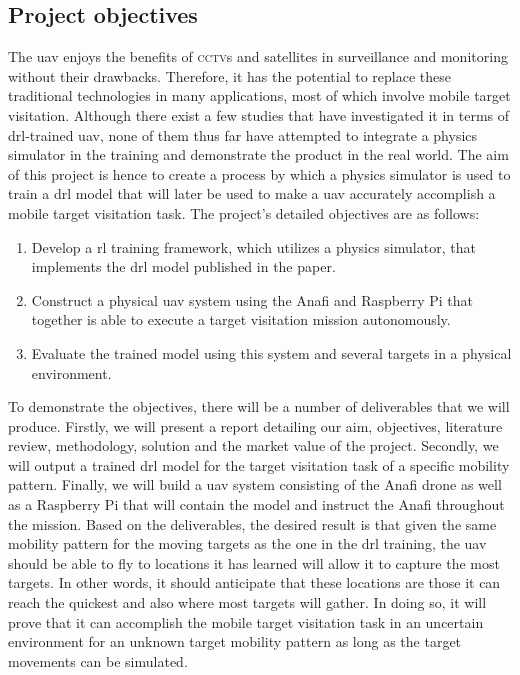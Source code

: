 \documentclass[../main.tex]{subfiles}
\begin{document}

\subsection{Project objectives}\label{sec:objectives}

The \gls{uav} enjoys the benefits of \textsc{cctv}s and satellites
in surveillance and monitoring without their drawbacks.
Therefore, it has the potential to replace these
traditional technologies in many applications, 
most of which involve mobile target visitation. 
Although there exist a few studies 
that have investigated it in terms of \gls{drl}-trained
\gls{uav},
none of them thus far have attempted to
integrate a physics simulator in the training
and demonstrate the product in the real world.
The aim of this project is hence to create a process 
by which a physics simulator is used to train 
a \gls{drl} model that will later be used
to make a \gls{uav} accurately accomplish a
mobile target visitation task.
The project's detailed objectives are as follows:

\begin{enumerate}
    \item Develop a \gls{rl} training framework,
        which utilizes a physics simulator, 
        that implements the \gls{drl} model 
        published in the \textcite{Ged21} paper.
    \item Construct a physical \gls{uav} system 
        using the Anafi and 
        Raspberry Pi that together is able to execute
        a target visitation mission autonomously.
    \item Evaluate the trained model using this system
        and several targets in a physical environment.
\end{enumerate}

To demonstrate the objectives, there will be a number 
of deliverables that we will produce.
Firstly, we will present a report detailing
our aim, objectives, literature review, methodology,
solution and the market value of the project.
Secondly, we will output a trained \gls{drl} model for 
the target visitation task of a specific
mobility pattern.
Finally, we will build a \gls{uav} system
consisting of the Anafi drone as well as a Raspberry Pi
that will contain the model and instruct
the Anafi throughout the mission.
Based on the deliverables, the desired result is that
given the same mobility pattern for 
the moving targets as the one in the \gls{drl} training,
the \gls{uav} should be able to fly to locations it has learned
will allow it to capture the most targets. In other words,
it should anticipate that these locations are those it can reach
the quickest and also where most targets will gather.
In doing so, it will prove that it can accomplish 
the mobile target visitation task in an uncertain environment
for an unknown target mobility pattern
as long as the target movements can be simulated.
\end{document}
